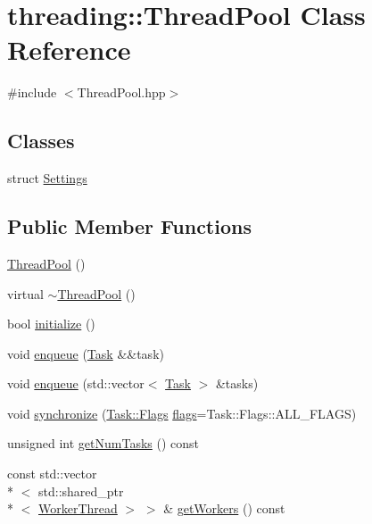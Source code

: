 \hypertarget{classthreading_1_1ThreadPool}{\section{threading\-:\-:Thread\-Pool Class Reference}
\label{classthreading_1_1ThreadPool}
}


{\ttfamily \#include $<$Thread\-Pool.\-hpp$>$}

\subsection*{Classes}
\begin{DoxyCompactItemize}
\item 
struct \hyperlink{structthreading_1_1ThreadPool_1_1Settings}{Settings}
\end{DoxyCompactItemize}
\subsection*{Public Member Functions}
\begin{DoxyCompactItemize}
\item 
\hyperlink{classthreading_1_1ThreadPool_ab086d54c3a92eb818183a5d10ce28958}{Thread\-Pool} ()
\item 
virtual \hyperlink{classthreading_1_1ThreadPool_ab0d196238cb68934bc4a00c39d0fd671}{$\sim$\-Thread\-Pool} ()
\item 
bool \hyperlink{classthreading_1_1ThreadPool_ae18ef9591cd182a65b6c3240e3dd47ec}{initialize} ()
\item 
void \hyperlink{classthreading_1_1ThreadPool_abe4bda038c0164bcc646d99bdb4ad7f1}{enqueue} (\hyperlink{classthreading_1_1Task}{Task} \&\&task)
\item 
void \hyperlink{classthreading_1_1ThreadPool_a2d1f3f9ac858ee2dbc247ff7868504d3}{enqueue} (std\-::vector$<$ \hyperlink{classthreading_1_1Task}{Task} $>$ \&tasks)
\item 
void \hyperlink{classthreading_1_1ThreadPool_a062eeda60615befa96d40860e74e5367}{synchronize} (\hyperlink{classthreading_1_1Task_a06b9fed2b0053a677b772b77a2932664}{Task\-::\-Flags} \hyperlink{Task_8cpp_a4a40799e9beb60c689725eb2614c0d5b}{flags}=Task\-::\-Flags\-::\-A\-L\-L\-\_\-\-F\-L\-A\-G\-S)
\item 
unsigned int \hyperlink{classthreading_1_1ThreadPool_a8b01d4f4fa658d9b8d22075876794fff}{get\-Num\-Tasks} () const 
\item 
const std\-::vector\\*
$<$ std\-::shared\-\_\-ptr\\*
$<$ \hyperlink{classthreading_1_1WorkerThread}{Worker\-Thread} $>$ $>$ \& \hyperlink{classthreading_1_1ThreadPool_afcb93fbe1992130250a779d611bc6396}{get\-Workers} () const 
\end{DoxyCompactItemize}
